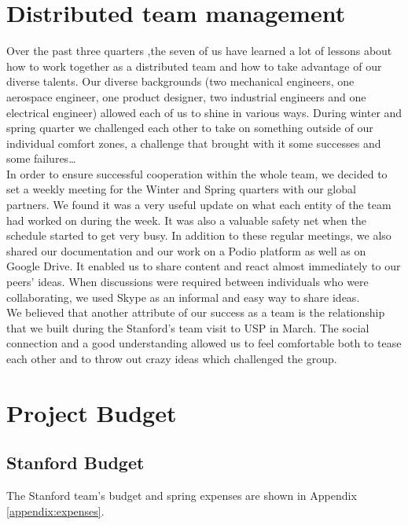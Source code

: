 \newpage

\section{Distributed team management}

Over the past three quarters ,the seven of us have learned a lot of lessons about how to work together as a distributed team and how to take advantage of our diverse talents. Our diverse backgrounds (two mechanical engineers, one aerospace engineer, one product designer, two industrial engineers and one electrical engineer) allowed each of us to shine in various ways. During winter and spring quarter we challenged each other to take on something outside of our individual comfort zones, a challenge that brought with it some successes and some failures…\\

In order to ensure successful cooperation within the whole team, we decided to set a weekly meeting for the Winter and Spring quarters with our global partners. We found it was a very useful update on what each entity of the team had worked on during the week. It was also a valuable safety net when the schedule started to get very busy. In addition to these regular meetings, we also shared our documentation and our work on a Podio platform as well as on Google Drive. It enabled us to share content and react almost immediately to our peers’ ideas. When discussions were required between individuals who were collaborating, we used Skype as an informal and easy way to share ideas.\\

We believed that another attribute of our success as a team is the relationship that we built during the Stanford’s team visit to USP in March. The social connection and a good understanding allowed us to feel comfortable both to tease each other and to throw out crazy ideas which challenged the group.

\section{Project Budget}

\subsection{Stanford Budget}
The Stanford team's budget and spring expenses are shown in Appendix \ref{appendix:expenses}.

